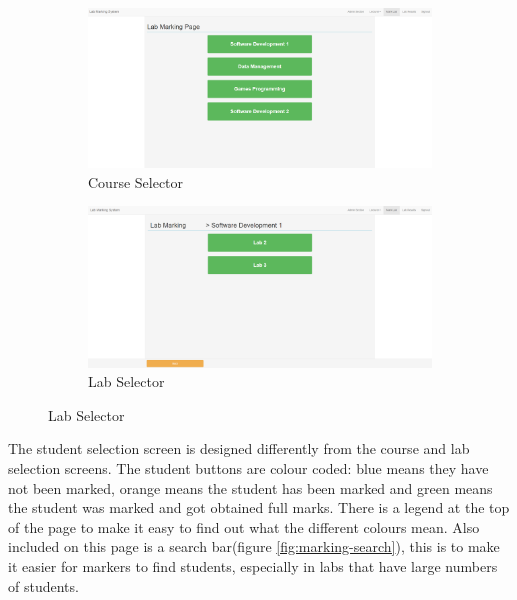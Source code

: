 \documentclass[12pt]{article}  %
\begin{document}
\begin{figure}[H]
\caption{Lab Marking Page}
\centering
\begin{subfigure}[c]{0.45\textwidth}
    \includegraphics[width=1\textwidth]{images/implementation/marking-1-page.png}
    \caption{Course Selector}
    \label{fig:marking-course}
\end{subfigure}
\hfill
\begin{subfigure}[c]{0.45\textwidth}
    \includegraphics[width=1\textwidth]{images/implementation/marking-2-page.png}
    \caption{Lab Selector}
    \label{fig:marking-lab}
\end{subfigure}

\end{figure}

\noindent The student selection screen is designed differently from the course and lab selection screens. The student buttons are colour coded: blue means they have not been marked, orange means the student has been marked and green means the student was marked and got obtained full marks. There is a legend at the top of the page to make it easy to find out what the different colours mean. Also included on this page is a search bar(figure \ref{fig:marking-search}), this is to make it easier for markers to find students, especially in labs that have large numbers of students.
\end{document}
